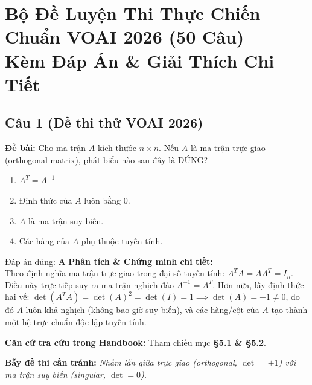 \documentclass[10pt,a4paper]{article}
\begin{document}
\section{Bộ Đề Luyện Thi Thực Chiến Chuẩn VOAI 2026 (50 Câu) --- Kèm Đáp Án \& Giải Thích Chi Tiết}

\begin{abstract}
\noindent Chương này tập hợp trọn vẹn \textbf{50 câu hỏi trắc nghiệm của Đề thi thử Vòng loại VOAI 2026} (Đỗ Đình Luật). Đây là bộ đề được đánh giá bám sát nhất cấu trúc kiến thức và phong cách ra đề của kỳ thi Olympic AI. Toàn bộ 50 câu đều được trình bày kèm \textbf{đáp án chính thức}, \textbf{chứng minh/tính toán toán học chi tiết}, \textbf{mục tra cứu lý thuyết tương ứng trong Handbook (§x.y)} và \textbf{các bẫy đề thi cần phòng tránh}, tạo thành công cụ đối chiếu tuyệt đối cho thí sinh khi luyện đề trên Web App.
\end{abstract}


\subsection*{Câu 1 (Đề thi thử VOAI 2026)}
\textbf{Đề bài:} Cho ma trận $A$ kích thước $n \times n$. Nếu $A$ là ma trận trực giao (orthogonal matrix), phát biểu nào sau đây là ĐÚNG?

\begin{enumerate}[label=\textbf{\Alph*.}]
    \item $A^T = A^{-1}$
    \item Định thức của $A$ luôn bằng 0.
    \item $A$ là ma trận suy biến.
    \item Các hàng của $A$ phụ thuộc tuyến tính.
\end{enumerate}

\begin{solbox}{Đáp án đúng: \textbf{A}}
\textbf{Phân tích \& Chứng minh chi tiết:} \\
Theo định nghĩa ma trận trực giao trong đại số tuyến tính: $A^T A = A A^T = I_n$. Điều này trực tiếp suy ra ma trận nghịch đảo $A^{-1} = A^T$. Hơn nữa, lấy định thức hai vế: $\det(A^T A) = \det(A)^2 = \det(I) = 1 \implies \det(A) = \pm 1 \neq 0$, do đó $A$ luôn khả nghịch (không bao giờ suy biến), và các hàng/cột của $A$ tạo thành một hệ trực chuẩn độc lập tuyến tính.

\vspace{0.4em}
\textbf{Căn cứ tra cứu trong Handbook:} Tham chiếu mục \textbf{§5.1 \& §5.2}.

\vspace{0.4em}
\textbf{Bẫy đề thi cần tránh:} \textit{Nhầm lẫn giữa trực giao (orthogonal, $\det = \pm 1$) với ma trận suy biến (singular, $\det = 0$).}
\end{solbox}
\vspace{0.5em}
\end{document}
